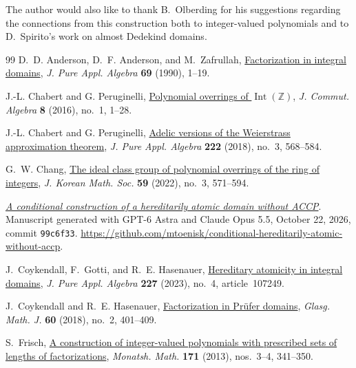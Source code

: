 \documentclass{article}
\theoremstyle{remark}
\begin{document}
The author would also like to thank B.\ Olberding for his suggestions regarding the connections from this construction both to integer-valued polynomials and to D.\ Spirito's work on almost Dedekind domains.

\begin{thebibliography}{99}
    D.~D. Anderson, D.~F. Anderson, and M.~Zafrullah, \href{https://doi.org/10.1016/0022-4049(90)90074-R}{Factorization in integral domains},
    \emph{J. Pure Appl. Algebra} \textbf{69} (1990), 1--19.

    J.-L. Chabert and G. Peruginelli, \href{https://doi.org/10.1216/JCA-2016-8-1-1}{Polynomial overrings of $\operatorname{Int}(\mathbb{Z})$},
    \emph{J. Commut. Algebra} \textbf{8} (2016), no.~1, 1--28.

    J.-L. Chabert and G. Peruginelli, \href{https://doi.org/10.1016/j.jpaa.2017.04.020}{Adelic versions of the Weierstrass approximation theorem},
    \emph{J. Pure Appl. Algebra} \textbf{222} (2018), no.~3, 568--584.

    G.~W. Chang, \href{https://doi.org/10.4134/JKMS.j210419}{The ideal class group of polynomial overrings of the ring of integers},
    \emph{J. Korean Math. Soc.} \textbf{59} (2022), no.~3, 571--594.

    \href{https://github.com/mtoenisk/conditional-hereditarily-atomic-without-accp/blob/99c6f3387494fbf02b0840e4393b64b876a90ac1/main.pdf}{\emph{A conditional construction of a hereditarily atomic domain without ACCP}}.
    Manuscript generated with GPT-6 Astra and Claude Opus 5.5, October 22, 2026, commit \texttt{99c6f33}.\newline
    \url{https://github.com/mtoenisk/conditional-hereditarily-atomic-without-accp}.

    J.~Coykendall, F.~Gotti, and R.~E. Hasenauer, \href{https://doi.org/10.1016/j.jpaa.2022.107249}{Hereditary atomicity in integral domains},
    \emph{J. Pure Appl. Algebra} \textbf{227} (2023), no.~4, article~107249.

    J.~Coykendall and R.~E. Hasenauer, \href{https://doi.org/10.1017/S0017089517000179}{Factorization in Pr\"ufer domains},
    \emph{Glasg. Math. J.} \textbf{60} (2018), no.~2, 401--409.

    S.~Frisch, \href{https://doi.org/10.1007/s00605-013-0508-z}{A construction of integer-valued polynomials with prescribed sets of lengths of factorizations},
    \emph{Monatsh. Math.} \textbf{171} (2013), nos.~3--4, 341--350.


\end{thebibliography}
\end{document}
